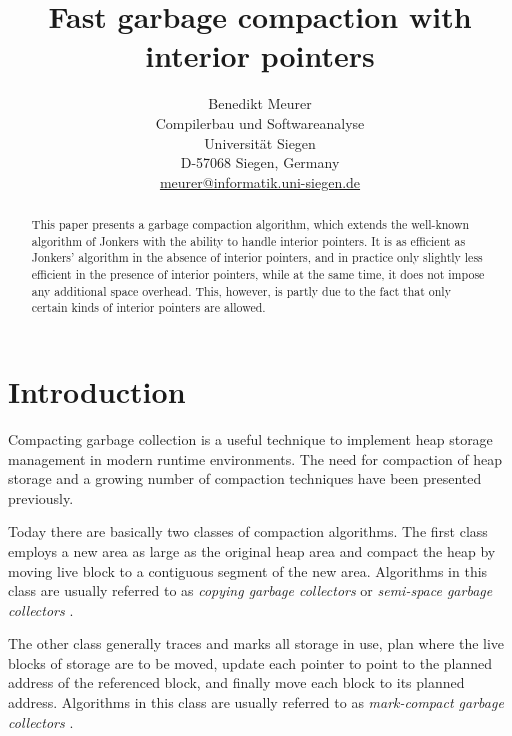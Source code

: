\documentclass[10pt,a4paper,final,twocolumn]{article}
\begin{document}
\author{%
  Benedikt Meurer\\
  Compilerbau und Softwareanalyse\\
  Universit\"at Siegen\\
  D-57068 Siegen, Germany\\
  \url{meurer@informatik.uni-siegen.de}
}
\date{}
\title{
  Fast garbage compaction with interior pointers
}
\maketitle

\begin{abstract}
  This paper presents a garbage compaction algorithm, which extends the well-known
  algorithm of Jonkers with the ability to handle interior pointers. It is as efficient
  as Jonkers' algorithm in the absence of interior pointers, and in practice only
  slightly less efficient in the presence of interior pointers, while at the same
  time, it does not impose any additional space overhead. This, however, is partly due
  to the fact that only certain kinds of interior pointers are allowed.
\end{abstract}


\section{Introduction}
\label{sec:Introduction}


Compacting garbage collection is a useful technique to implement heap storage management
in modern runtime environments. The need for compaction of heap storage and a growing
number of compaction techniques have been presented previously.

Today there are basically two classes of compaction algorithms. The first class employs a
new area as large as the original heap area and compact
the heap by moving live block to a contiguous segment of the new area. Algorithms in
this class are usually referred to as \emph{copying garbage collectors} or \emph{semi-space
garbage collectors} \cite{Cheney70,Clark76,FenichelYochelson69,Minsky63,Reingold73}.

The other class generally
traces and marks all storage in use, plan where the live blocks of storage are to be
moved, update each pointer to point to the planned address of the referenced block, and
finally move each block to its planned address. Algorithms in this class are usually
referred to as \emph{mark-compact garbage collectors}
\cite{Fisher74,FitchNorman78,HaddonWaite67,Jonkers79,LangWegbreit72,Morris78,Thorelli76,Wegbreit72}.
\end{document}
